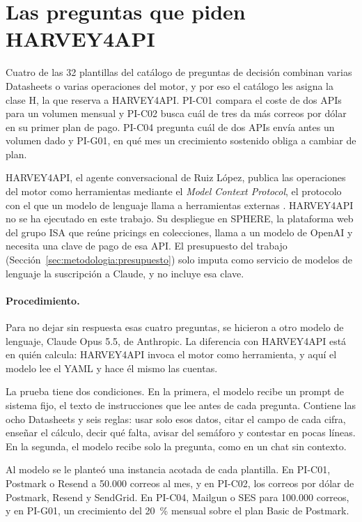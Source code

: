 \section{Las preguntas que piden HARVEY4API}
\label{sec:comparacion:harvey}

Cuatro de las 32 plantillas del catálogo de preguntas de decisión combinan varias Datasheets o varias operaciones del motor, y por eso el catálogo les asigna la clase H, la que reserva a HARVEY4API.
PI-C01 compara el coste de dos APIs para un volumen mensual y PI-C02 busca cuál de tres da más correos por dólar en su primer plan de pago.
PI-C04 pregunta cuál de dos APIs envía antes un volumen dado y PI-G01, en qué mes un crecimiento sostenido obliga a cambiar de plan.

HARVEY4API, el agente conversacional de Ruiz López, publica las operaciones del motor como herramientas mediante el \textit{Model Context Protocol}, el protocolo con el que un modelo de lenguaje llama a herramientas externas \citep{ruizlopez2026tfm,mcp}.
HARVEY4API no se ha ejecutado en este trabajo.
Su despliegue en SPHERE, la plataforma web del grupo ISA que reúne pricings en colecciones, llama a un modelo de OpenAI y necesita una clave de pago de esa API.
El presupuesto del trabajo (Sección~\ref{sec:metodologia:presupuesto}) solo imputa como servicio de modelos de lenguaje la suscripción a Claude, y no incluye esa clave.

\paragraph{Procedimiento.}

Para no dejar sin respuesta esas cuatro preguntas, se hicieron a otro modelo de lenguaje, Claude Opus 5.5, de Anthropic.
La diferencia con HARVEY4API está en quién calcula: HARVEY4API invoca el motor como herramienta, y aquí el modelo lee el YAML y hace él mismo las cuentas.

La prueba tiene dos condiciones.
En la primera, el modelo recibe un prompt de sistema fijo, el texto de instrucciones que lee antes de cada pregunta.
Contiene las ocho Datasheets y seis reglas: usar solo esos datos, citar el campo de cada cifra, enseñar el cálculo, decir qué falta, avisar del semáforo y contestar en pocas líneas.
En la segunda, el modelo recibe solo la pregunta, como en un chat sin contexto.

Al modelo se le planteó una instancia acotada de cada plantilla.
En PI-C01, Postmark o Resend a 50.000 correos al mes, y en PI-C02, los correos por dólar de Postmark, Resend y SendGrid.
En PI-C04, Mailgun o SES para 100.000 correos, y en PI-G01, un crecimiento del 20~\% mensual sobre el plan Basic de Postmark.

